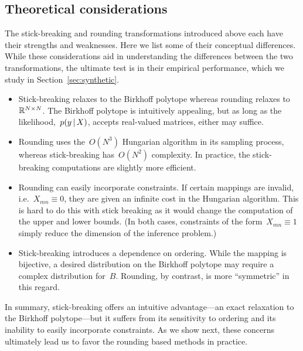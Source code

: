 \documentclass[twoside]{article}
\begin{document}
\subsection{Theoretical considerations}
\label{sec:considerations}

The stick-breaking and rounding transformations introduced above each
have their strengths and weaknesses.  Here we list some of their
conceptual differences.  While these considerations aid in
understanding the differences between the two transformations, the
ultimate test is in their empirical performance, which we study in
Section~\ref{sec:synthetic}.

\begin{itemize}
\item Stick-breaking relaxes to the Birkhoff polytope whereas rounding
  relaxes to~$\mathbb{R}^{N \times N}$. The Birkhoff polytope is
  intuitively appealing, but as long as the
  likelihood,~$p(y \, | \, X)$, accepts real-valued matrices, either
  may suffice.
  
\item Rounding uses the~$O(N^3)$ Hungarian algorithm in its sampling
  process, whereas stick-breaking has~$O(N^2)$ complexity. In practice,
  the stick-breaking computations are slightly more efficient.
    
\item Rounding can easily incorporate constraints.  If certain
  mappings are invalid, i.e.~${X_{mn} \equiv 0}$, they are given an
  infinite cost in the Hungarian algorithm. This is hard to do this
  with stick breaking as it would change the computation of the upper
  and lower bounds. (In both cases, constraints of the
  form~$X_{mn} \equiv 1$ simply reduce the dimension of the inference
  problem.)
  
\item Stick-breaking introduces a dependence on ordering.  While the
  mapping is bijective, a desired distribution on the Birkhoff polytope
  may require a complex distribution for~$B$.  Rounding, by contrast,
  is more ``symmetric'' in this regard.
  
\end{itemize}

In summary, stick-breaking offers an intuitive advantage---an exact
relaxation to the Birkhoff polytope---but it suffers from its
sensitivity to ordering and its inability to easily incorporate
constraints.  As we show next, these concerns ultimately lead us to
favor the rounding based methods in practice.
\end{document}
